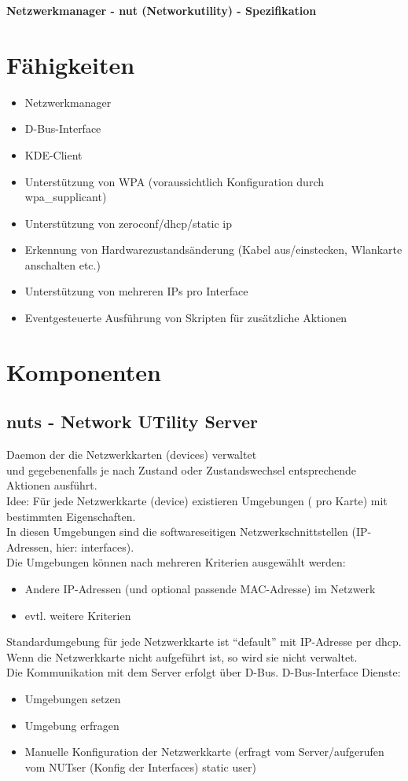 \documentclass[a4paper,10pt]{scrartcl}
\begin{document}
\begin{Large}\textbf{Netzwerkmanager - nut (Networkutility) - Spezifikation}\end{Large}


\section*{Fähigkeiten}
\begin{itemize}
\item Netzwerkmanager
\item D-Bus-Interface
\item KDE-Client
\item Unterstützung von WPA (voraussichtlich Konfiguration durch wpa\_supplicant)
\item Unterstützung von zeroconf/dhcp/static ip
\item Erkennung von Hardwarezustandsänderung (Kabel aus/einstecken, Wlankarte anschalten etc.)
\item Unterstützung von mehreren IPs pro Interface 
\item Eventgesteuerte Ausführung von Skripten für zusätzliche Aktionen
\end{itemize}


\section*{Komponenten}
\subsection*{nuts - Network UTility Server}
Daemon der die Netzwerkkarten (devices) verwaltet \\
und gegebenenfalls je nach Zustand oder Zustandswechsel entsprechende Aktionen ausführt. \\
Idee:
Für jede Netzwerkkarte (device) existieren Umgebungen ( pro Karte) mit bestimmten Eigenschaften. \\
In diesen Umgebungen sind die softwareseitigen Netzwerkschnittstellen (IP-Adressen, hier: interfaces).\\
Die Umgebungen können nach mehreren Kriterien ausgewählt werden:
\begin{itemize}
 \item Andere IP-Adressen (und optional passende MAC-Adresse) im Netzwerk
 \item evtl. weitere Kriterien
\end{itemize}
Standardumgebung für jede Netzwerkkarte ist ``default'' mit IP-Adresse per dhcp. \\
Wenn die Netzwerkkarte nicht aufgeführt ist, so wird sie nicht verwaltet.\\
Die Kommunikation mit dem Server erfolgt über D-Bus.
D-Bus-Interface Dienste:
\begin{itemize}
 \item Umgebungen setzen
 \item Umgebung erfragen
 \item Manuelle Konfiguration der Netzwerkkarte (erfragt vom Server/aufgerufen vom NUTser (Konfig der Interfaces) static user)
\end{itemize}
\end{document}

